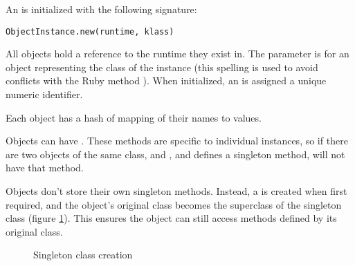 An  is initialized with the following signature:

\begin{lstlisting}
ObjectInstance.new(runtime, klass)
\end{lstlisting}

All  objects hold a reference to the runtime they exist in. The  parameter is for an object representing the class of the instance (this spelling is used to avoid conflicts with the Ruby method ). When initialized, an  is assigned a unique numeric identifier.

Each object has a hash of  mapping of their names to values.

Objects can have . These methods are specific to individual instances, so if there are two objects of the same class,  and , and  defines a singleton method,  will not have that method.

Objects don't store their own singleton methods. Instead, a  is created when first required, and the object's original class becomes the superclass of the singleton class (figure \ref{fig:singleton_class_creation}). This ensures the object can still access methods defined by its original class.

\begin{figure}
\begin{center}
\caption{Singleton class creation}
\label{fig:singleton_class_creation}
\end{center}
\end{figure}

